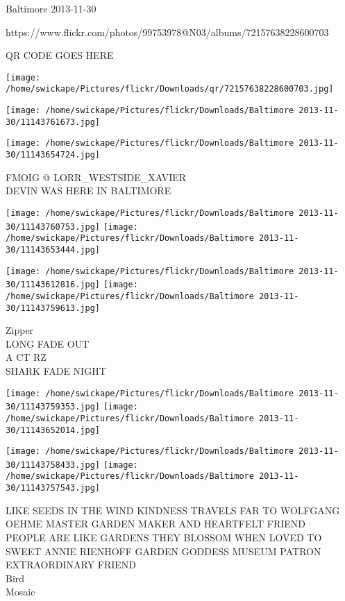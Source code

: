 \documentclass[10pt,letterpaper]{article}
\begin{document}
Baltimore 2013-11-30

https://www.flickr.com/photos/99753978@N03/albums/72157638228600703

QR CODE GOES HERE

\texttt{[image: /home/swickape/Pictures/flickr/Downloads/qr/72157638228600703.jpg]}
\pagebreak

\texttt{[image: /home/swickape/Pictures/flickr/Downloads/Baltimore 2013-11-30/11143761673.jpg]}

\vspace{0.25in}
\texttt{[image: /home/swickape/Pictures/flickr/Downloads/Baltimore 2013-11-30/11143654724.jpg]}

FMOIG @ LORR\_WESTSIDE\_XAVIER\\
DEVIN WAS HERE IN BALTIMORE\\
\pagebreak

\texttt{[image: /home/swickape/Pictures/flickr/Downloads/Baltimore 2013-11-30/11143760753.jpg]}
\texttt{[image: /home/swickape/Pictures/flickr/Downloads/Baltimore 2013-11-30/11143653444.jpg]}

\texttt{[image: /home/swickape/Pictures/flickr/Downloads/Baltimore 2013-11-30/11143612816.jpg]}
\texttt{[image: /home/swickape/Pictures/flickr/Downloads/Baltimore 2013-11-30/11143759613.jpg]}

Zipper\\
LONG FADE OUT\\
A CT RZ\\
SHARK FADE NIGHT\\
\pagebreak

\texttt{[image: /home/swickape/Pictures/flickr/Downloads/Baltimore 2013-11-30/11143759353.jpg]}
\texttt{[image: /home/swickape/Pictures/flickr/Downloads/Baltimore 2013-11-30/11143652014.jpg]}

\texttt{[image: /home/swickape/Pictures/flickr/Downloads/Baltimore 2013-11-30/11143758433.jpg]}
\texttt{[image: /home/swickape/Pictures/flickr/Downloads/Baltimore 2013-11-30/11143757543.jpg]}

LIKE SEEDS IN THE WIND KINDNESS TRAVELS FAR TO WOLFGANG OEHME MASTER GARDEN MAKER AND HEARTFELT FRIEND\\
PEOPLE ARE LIKE GARDENS THEY BLOSSOM WHEN LOVED TO SWEET ANNIE RIENHOFF GARDEN GODDESS MUSEUM PATRON EXTRAORDINARY FRIEND\\
Bird\\
Mosaic\\
\pagebreak
\end{document}
